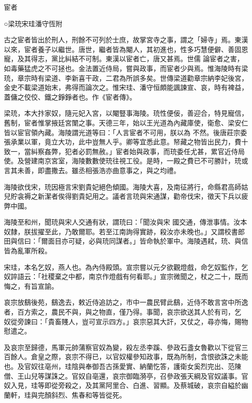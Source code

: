
\begin{pinyinscope}

 宦者



 ○梁珫宋珪潘守恆附



 古之宦者皆出於刑人，刑餘不可列於士庶，故掌宮寺之事，謂之「婦寺」焉。東漢以來，宦者養子以繼世。唐世，繼者皆為閹人，其初進也，性多巧慧便僻、善固恩寵，及其得志，黨比糾結不可制。東漢以宦者亡，唐又甚焉。世儒
 論宦者之害，如毒藥猛虎之不可拯也。金法置近侍局，嘗與政事，而宦者少與焉。惟海陵時有梁珫，章宗時有梁道、李新喜干政，二君為所誤多矣。世傳梁道勸章宗納李妃後宮，金史不載梁道始末，弗得而論次之。惟宋珪、潘守恒頗能諷諫宣、哀，時有裨益，蓋傭之佼佼、鐵之錚錚者也。作《宦者傳》。



 梁珫，本大抃家奴，隨元妃入宮，以閹豎事海陵。珫性便佞，善迎合，特見寵信，舊制，宦者惟掌掖廷宮闈之事。天德三年，始以王光道為內藏庫使，衛愈、梁安仁皆以宦官領內藏。海陵謂光道等曰：「人言宦者不可用，朕以為
 不然。後唐莊宗委張承業以軍，竟立大功，此中豈無人乎。卿等宜悉此意。帑藏之物皆出民力，費十致一，當糾察姦弊，犯者必罰無赦。」宦者始與政事，而珫委任尤甚，累官近侍局使。及營建南京宮室，海陵數數使珫往視工役。是時，一殿之費已不可勝計，珫或言其未善，即盡撒去。雖丞相張浩亦曲意事之，與之均禮。



 海陵欲伐宋，珫因極言宋劉貴妃絕色傾國。海陵大喜，及南征將行，命縣君高師姑兒貯衾褥之新潔者俟得劉貴妃用之。議者言珫與宋通謀，勸帝伐宋，徵天下兵以疲弊中國。



 海陵至和州，聞珫與宋人交通有狀，謂珫曰：「聞汝與宋
 國交通，傳泄事情。汝本奴隸，朕拔擢至此，乃敢爾耶。若至江南詢得實跡，殺汝亦未晚也。」又謂校書郎田與信曰：「爾面目亦可疑，必與珫同謀者。」皆命執於軍中。海陵遇弒，珫、與信皆為亂軍所殺。



 宋珪，本名乞奴，燕人也。為內侍殿頭。宣宗嘗以元夕欲觀燈戲，命乞奴監作，乞奴誶語云：「社稷棄之中都，南京作燈戲有何看耶。」宣宗微聞之，杖之二十，既而悔之，有旨宣諭。



 哀宗放鷂後苑，鷂逸去，敕近侍追訪之，市中一農民臂此鷂，近侍不敢言宮中所逸者，百方索之，農民不與，與之物直，僅乃得。事聞，哀宗欲送其人於有司，乞
 奴從旁諫曰：「貴畜賤人，豈可宣示四方。」哀宗惡其大訐，又仗之，尋亦悔，賜物慰遣之。



 及哀宗至歸德，馬軍元帥蒲察官奴為變，殺左丞李蹊、參政石盞女魯歡以下從官三百餘人。倉皇之際，哀宗不得已，以官奴權參知政事，既為所制，含恨欲誅之未能也。及官奴往亳州，珪陰與奉御吾古孫愛實、納蘭忔答，護衛女奚烈完出、范陳僧、王山兒等謀誅之。官奴自亳還，哀宗御臨漪亭，召參政張天綱及官奴議事。官奴入見，珪等即從旁殺之，及其黨阿里合、白進、習顯。及蔡城破，哀宗自縊於幽蘭軒，珪與完顏斜烈、焦春和等皆從死。




\end{pinyinscope}
